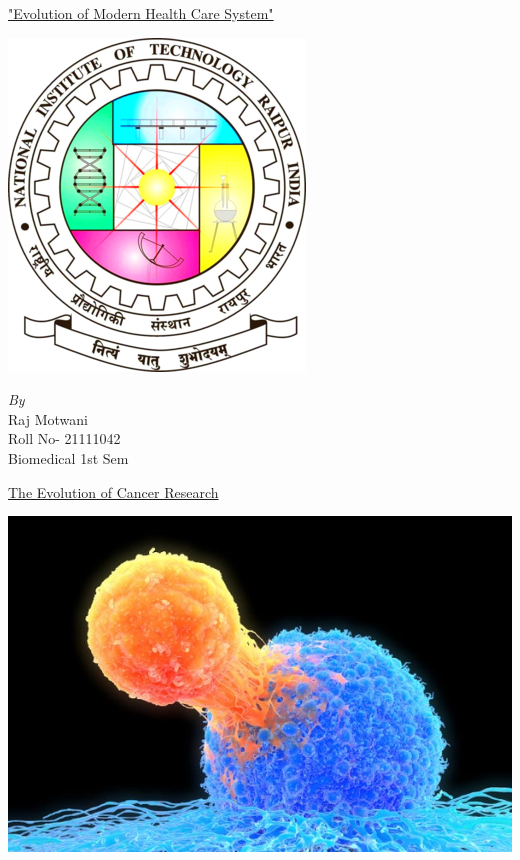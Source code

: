\documentclass[12pt]{article}
\begin{document}
\begin{center}
\huge\underline{"Evolution of Modern Health Care System"}
\end{center}
\begin{center}
 \includegraphics[scale=0.8]{nitlogo.png }
\end{center}
\vspace{1cm}
\begin{center}
   \emph{\large By}\\
\Large{Raj Motwani }\\
\large{Roll No- 21111042}\\
\large{Biomedical 1st Sem}\\
\end{center}
\begin{center}
\newpage
\huge{\underline{The Evolution  of  Cancer Research}}
\end{center}


\includegraphics[scale=0.5]{canc.jpg}
\end{document}
